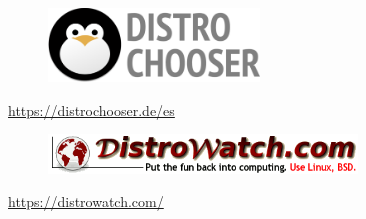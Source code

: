 \documentclass[aspectratio=43]{beamer}
\begin{document}
     \begin{frame}{\subsecname}{}
        \centering
        \begin{figure}
            \includegraphics[width=0.5\textwidth]{img/distrochooser.png}
        \end{figure}
        \centering \url{https://distrochooser.de/es}
        \\\bigskip
        \begin{figure}
            \includegraphics[width=0.73\textwidth]{img/distrowatch.png}
        \end{figure}
        \centering \url{https://distrowatch.com/}
    \end{frame}

\end{document}
